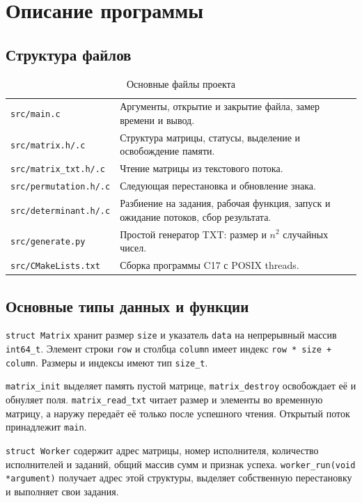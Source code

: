 \documentclass[12pt,a4paper]{article}
\begin{document}
\section{Описание программы}
\subsection{Структура файлов}
\begin{table}[H]
\caption{Основные файлы проекта}
\begin{tabularx}{\linewidth}{|P{4.6cm}|L|}
\hline
{} &  \\ \hline
\texttt{src/main.c} & Аргументы, открытие и закрытие файла, замер времени и вывод. \\ \hline
\texttt{src/matrix.h/.c} & Структура матрицы, статусы, выделение и освобождение памяти. \\ \hline
\texttt{src/matrix\_txt.h/.c} & Чтение матрицы из текстового потока. \\ \hline
\texttt{src/permutation.h/.c} & Следующая перестановка и обновление знака. \\ \hline
\texttt{src/determinant.h/.c} & Разбиение на задания, рабочая функция, запуск и ожидание потоков, сбор результата. \\ \hline
\texttt{src/generate.py} & Простой генератор TXT: размер и $n^2$ случайных чисел. \\ \hline
\texttt{src/CMakeLists.txt} & Сборка программы C17 с POSIX threads. \\ \hline
\end{tabularx}
\end{table}

\subsection{Основные типы данных и функции}
\texttt{struct Matrix} хранит размер \texttt{size} и указатель \texttt{data} на непрерывный массив \texttt{int64\_t}. Элемент строки \texttt{row} и столбца \texttt{column} имеет индекс \texttt{row * size + column}. Размеры и индексы имеют тип \texttt{size\_t}.

\texttt{matrix\_init} выделяет память пустой матрице, \texttt{matrix\_destroy} освобождает её и обнуляет поля. \texttt{matrix\_read\_txt} читает размер и элементы во временную матрицу, а наружу передаёт её только после успешного чтения. Открытый поток принадлежит \texttt{main}.

\texttt{struct Worker} содержит адрес матрицы, номер исполнителя, количество исполнителей и заданий, общий массив сумм и признак успеха. \texttt{worker\_run(void *argument)} получает адрес этой структуры, выделяет собственную перестановку и выполняет свои задания.
\end{document}
